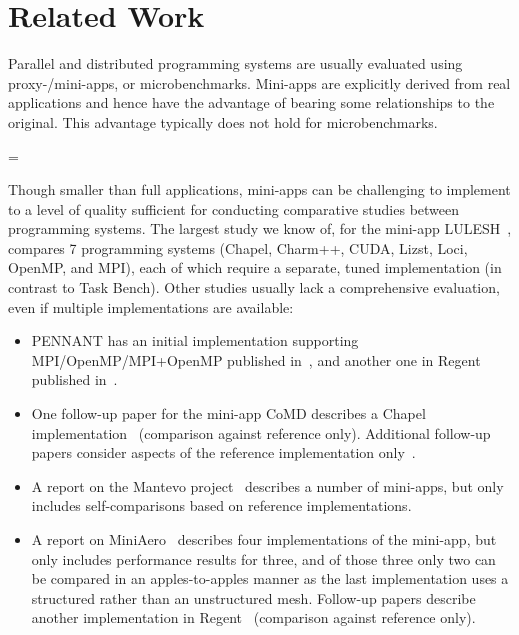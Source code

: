 \section{Related Work}
\label{sec:related-work}

{}

Parallel and distributed programming systems are usually
evaluated using proxy-/mini-apps, or
microbenchmarks. Mini-apps are explicitly derived from real
applications and hence have the advantage of bearing some
relationships to the original. This advantage typically does not hold
for microbenchmarks.

\brokenpenalty=\oldbrokenpenalty

Though smaller than full applications, mini-apps can be challenging to
implement to a level of quality sufficient for conducting comparative
studies between programming systems. The largest study we know of,
for the mini-app LULESH~\cite{LULESH13}, compares 7 programming
systems (Chapel, Charm++, CUDA, Lizst, Loci, OpenMP, and MPI), each of
which require a separate, tuned implementation (in contrast to
Task Bench). Other
studies usually lack a comprehensive evaluation, even if multiple
implementations are available:

\begin{itemize}

\item
PENNANT has an initial implementation supporting MPI/OpenMP/MPI+OpenMP
published in~\cite{PENNANT}, and another one in Regent published
in~\cite{Regent15, ControlReplication17, LegionTracing18}.  

\item
One follow-up paper for the mini-app CoMD describes a Chapel
implementation~\cite{CoMDChapel16} (comparison against reference
only). Additional follow-up papers consider aspects of the reference
implementation only~\cite{CoMDLoadImbalance17,
  CoMDThreadedModels14}.

\item
A report on the Mantevo project~\cite{Mantevo09} describes a number of
mini-apps, but only includes self-comparisons based on reference
implementations.

\item
A report on MiniAero~\cite{SandiaReportManyTaskRuntimes15} describes
four implementations of the mini-app, but only includes performance
results for three, and of those three only two can be compared in an
apples-to-apples manner as the last implementation uses a structured
rather than an unstructured mesh. Follow-up papers describe another
implementation in Regent~\cite{Regent15,
  ControlReplication17, LegionTracing18} (comparison against reference
only).

\end{itemize}

